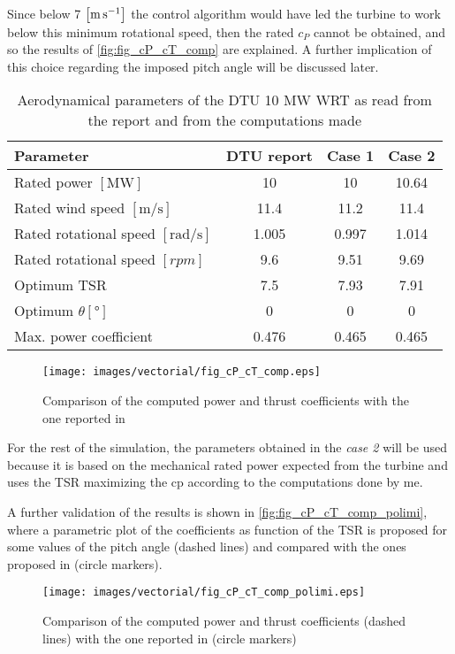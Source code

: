 Since below 7 $\left[\si{\meter\per\second}\right]$ the control algorithm would have led the turbine to work below this minimum rotational speed, then the rated $c_P$ cannot be obtained, and so the results of \autoref{fig:fig_cP_cT_comp} are explained. A further implication of this choice regarding the imposed pitch angle will be discussed later.

\begin{table}[htb]
    \caption{Aerodynamical parameters of the DTU 10 MW \acrshort{WRT} as read from the report and from the computations made}
    \centering
    \begin{tabular}{lccc}
    \toprule
    Parameter & DTU report & Case 1 & Case 2\\ \midrule
    Rated power $\left[\si{\mega \watt}\right]$ & 10 & 10 & 10.64  \\
    Rated wind speed $\left[\si{\meter \per \second}\right]$ & 11.4 & 11.2 & 11.4 \\
    Rated rotational speed $\left[\si{\radian \per \second}\right]$ & 1.005 & 0.997 & 1.014 \\
    Rated rotational speed $\left[rpm\right]$ & 9.6 & 9.51 & 9.69\\
    Optimum \acrshort{TSR} & 7.5 & 7.93 & 7.91\\
    Optimum $\theta \left[\si{\degree}\right]$ & 0 & 0 & 0 \\
    Max. power coefficient & 0.476 & 0.465 & 0.465 \\
    \bottomrule
    \end{tabular}
    \label{tab:DTU_10_aero}
\end{table}

\begin{figure}[htb]
    \centering
    \texttt{[image: images/vectorial/fig\_cP\_cT\_comp.eps]}
    \caption{Comparison of the computed power and thrust coefficients with the one reported in \cite{DTU_Wind_Energy_Report-I-0092}}
    \label{fig:fig_cP_cT_comp}
\end{figure}
For the rest of the simulation, the parameters obtained in the \textit{case 2} will be used because it is based on the mechanical rated power expected from the turbine and uses the \acrlong{TSR} maximizing the \acrlong{cp} according to the computations done by me.

A further validation of the results is shown in \autoref{fig:fig_cP_cT_comp_polimi}, where a parametric plot of the coefficients as function of the \acrshort{TSR} is proposed for some values of the pitch angle (dashed lines) and compared with the ones proposed in  \cite{Variable-speed_Variable-pitch_control_for_a_wind_t} (circle markers).
\begin{figure}[htb]
    \centering
    \texttt{[image: images/vectorial/fig\_cP\_cT\_comp\_polimi.eps]}
    \caption{Comparison of the computed power and thrust coefficients (dashed lines) with the one reported in \cite{Variable-speed_Variable-pitch_control_for_a_wind_t} (circle markers)}
    \label{fig:fig_cP_cT_comp_polimi}
\end{figure}

